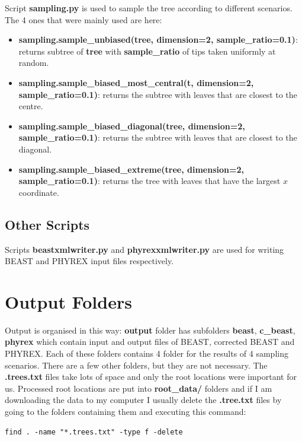 Script \textbf{sampling.py} is used to sample the tree according to different scenarios. The 4 ones that were mainly used are here:

\begin{itemize}
\item \textbf{sampling.sample\_unbiased(tree, dimension=2, sample\_ratio=0.1)}: returns subtree of \textbf{tree} with \textbf{sample\_ratio} of tips taken uniformly at random.

\item \textbf{sampling.sample\_biased\_most\_central(t, dimension=2, sample\_ratio=0.1)}: returns the subtree with leaves that are closest to the centre.

\item \textbf{sampling.sample\_biased\_diagonal(tree, dimension=2, sample\_ratio=0.1)}: returns the subtree with leaves that are closest to the diagonal.

\item \textbf{sampling.sample\_biased\_extreme(tree, dimension=2, sample\_ratio=0.1)}: returns the tree with leaves that have the largest $x$ coordinate.
\end{itemize}

\subsection*{Other Scripts}
Scripts \textbf{beastxmlwriter.py} and \textbf{phyrexxmlwriter.py} are used for writing BEAST and PHYREX input files respectively.

\section*{Output Folders}
Output is organised in this way: \textbf{output} folder has subfolders 
\textbf{beast}, \textbf{c\_beast}, \textbf{phyrex} which contain input and output files of BEAST, corrected BEAST and PHYREX. Each of these folders contains 4 folder for the results of 4 sampling scenarios. There are a few other folders, but they are not necessary.
The \textbf{.trees.txt} files take lots of space and only the root locations were important for us. Processed root locations are put into \textbf{root\_data/} folders and if I am downloading the data to my computer I usually delete the \textbf{.tree.txt} files by going to the folders containing them and executing this command:

\begin{verbatim}
find . -name "*.trees.txt" -type f -delete
\end{verbatim} 


